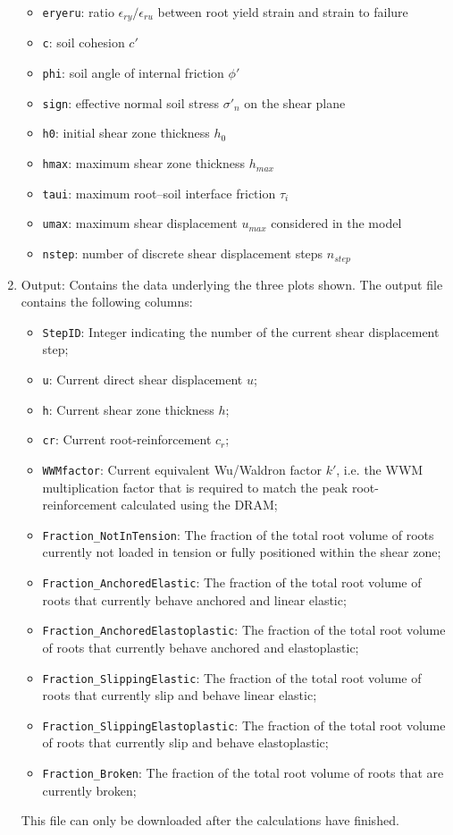 \documentclass[a4 paper, 11  pt]{article}
\begin{document}
\begin{enumerate}
\begin{itemize}
		\item \texttt{eryeru}: ratio $\epsilon_{ry}/\epsilon_{ru}$ between root yield strain and strain to failure
		\item \texttt{c}: soil cohesion $c'$
		\item \texttt{phi}: soil angle of internal friction $\phi'$
		\item \texttt{sign}: effective normal soil stress $\sigma'_n$ on the shear plane 
		\item \texttt{h0}: initial shear zone thickness $h_0$
		\item \texttt{hmax}: maximum shear zone thickness $h_{max}$
		\item \texttt{taui}: maximum root--soil interface friction $\tau_i$
		\item \texttt{umax}: maximum shear displacement $u_{max}$ considered in the model
		\item \texttt{nstep}: number of discrete shear displacement steps $n_{step}$
		\end{itemize}
	\item Output: Contains the data underlying the three plots shown. The output file contains the following columns:
	\begin{itemize}
		\parskip=0pt
		\itemsep=0pt
		\item \texttt{StepID}: Integer indicating the number of the current shear displacement step;
		\item \texttt{u}: Current direct shear displacement $u$;
		\item \texttt{h}: Current shear zone thickness $h$;
		\item \texttt{cr}: Current root-reinforcement $c_r$;
		\item \texttt{WWMfactor}: Current equivalent Wu/Waldron factor $k'$, i.e. the WWM multiplication factor that is required to match the peak root-reinforcement calculated using the DRAM;
		\item \texttt{Fraction\_NotInTension}: The fraction of the total root volume of roots currently not loaded in tension or fully positioned within the shear zone;
		\item \texttt{Fraction\_AnchoredElastic}: The fraction of the total root volume of roots that currently behave anchored and linear elastic;
		\item \texttt{Fraction\_AnchoredElastoplastic}: The fraction of the total root volume of roots that currently behave anchored and elastoplastic;
		\item \texttt{Fraction\_SlippingElastic}: The fraction of the total root volume of roots that currently slip and behave linear elastic;
		\item \texttt{Fraction\_SlippingElastoplastic}: The fraction of the total root volume of roots that currently slip and behave elastoplastic;
		\item \texttt{Fraction\_Broken}: The fraction of the total root volume of roots that are currently broken;
	\end{itemize}
	This file can only be downloaded after the calculations have finished.
\end{enumerate}
\end{document}
